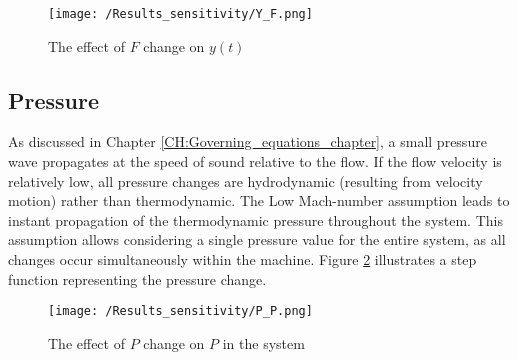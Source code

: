 \documentclass[../Article_Sensitivity_Analsysis.tex]{subfiles}
\begin{document}
    
    \begin{figure}[h!]
    	\centering
    	\texttt{[image: /Results\_sensitivity/Y\_F.png]}
    	\caption{The effect of $F$ change on $y(t)$}
    	\label{fig:Sensitivty_F_y}
    \end{figure}
    
    \subsection{Pressure}
    
    As discussed in Chapter \ref{CH:Governing_equations_chapter}, a small pressure wave propagates at the speed of sound relative to the flow. If the flow velocity is relatively low, all pressure changes are hydrodynamic (resulting from velocity motion) rather than thermodynamic. The Low Mach-number assumption leads to instant propagation of the thermodynamic pressure throughout the system. This assumption allows considering a single pressure value for the entire system, as all changes occur simultaneously within the machine. Figure \ref{fig:Sensitivty_P_P} illustrates a step function representing the pressure change.
    
    \begin{figure}[h!]
    	\centering
    	\texttt{[image: /Results\_sensitivity/P\_P.png]}
    	\caption{The effect of $P$ change on $P$ in the system}
    	\label{fig:Sensitivty_P_P}
    \end{figure}
    
\end{document}
